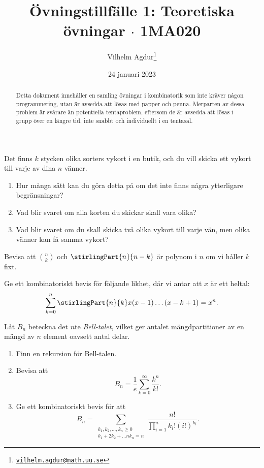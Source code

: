 \documentclass[nobib]{tufte-handout}
\title{Övningstillfälle 1: Teoretiska övningar $\cdot$ 1MA020}
\author[Vilhelm Agdur]{Vilhelm Agdur\thanks{\href{mailto:vilhelm.agdur@math.uu.se}{\nolinkurl{vilhelm.agdur@math.uu.se}}}}
\date{24 januari 2023}
\begin{document}
\maketitle%

\begin{abstract}
\noindent
Detta dokument innehåller en samling övningar i kombinatorik som inte kräver någon programmering, utan är avsedda att lösas med papper och penna. Merparten av dessa problem är svårare än potentiella tentaproblem, eftersom de är avsedda att lösas i grupp över en längre tid, inte snabbt och individuellt i en tentasal.
\end{abstract}

\begin{xca}
    Det finns $k$ stycken olika sorters vykort i en butik, och du vill skicka ett vykort till varje av dina $n$ vänner.

    \begin{enumerate}
        \item Hur många sätt kan du göra detta på om det inte finns några ytterligare begränsningar?
        \item Vad blir svaret om alla korten du skickar skall vara olika?
        \item Vad blir svaret om du skall skicka två olika vykort till varje vän, men olika vänner kan få samma vykort?
    \end{enumerate}
\end{xca}

\begin{xca}
    Bevisa att $\binom{n}{k}$ och $\stirlingPart{n}{n-k}$ är polynom i $n$ om vi håller $k$ fixt.
\end{xca}

\begin{xca}
    Ge ett kombinatoriskt bevis för följande likhet, där vi antar att $x$ är ett heltal:
    $$\sum_{k = 0}^{n} \stirlingPart{n}{k}x(x-1)\ldots(x-k+1) = x^n.$$
\end{xca}

\begin{xca}
    Låt $B_n$ beteckna det $n$te \emph{Bell-talet}, vilket ger antalet mängdpartitioner av en mängd av $n$ element oavsett antal delar.

    \begin{enumerate}[label = \roman*)]
        \item Finn en rekursion för Bell-talen.
        \item Bevisa att
        $$B_n = \frac{1}{e}\sum_{k = 0}^{\infty} \frac{k^n}{k!}.$$
        \item Ge ett kombinatoriskt bevis för att
        $$B_n = \sum_{\substack{k_1, k_2, \ldots, k_n \geq 0\\k_1 + 2k_2 + \ldots nk_n = n}} \frac{n!}{\prod_{i=1}^{n} k_i!(i!)^{k_i}}.$$
    \end{enumerate}
\end{xca}
\end{document}
